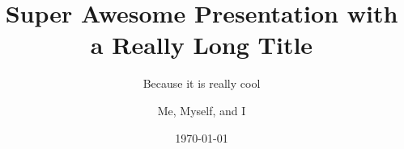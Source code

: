 \documentclass{beamer}
\title{Super Awesome Presentation with a Really Long Title}
\subtitle{Because it is really cool}
\author{Me, Myself, and I}
\institute{Distinguished Institute,\par%
           Prestigious, Locale, 12345}
\date{\today}
\begin{document}
\begin{frame}
\titlepage
\end{frame}
\end{document}
